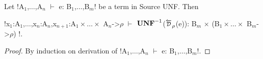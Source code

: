 \begin{lemma}
    Let !A$_{1}$,$\ldots$,A$_{n}$ $\vdash$ e: B$_{1}$,$\ldots$,B$_{m}$! be a term in Source UNF. Then
    \begin{center}
        !x$_1$:A$_{1}$,$\ldots$,x$_n$:A$_{n}$,x$_{n+1}$:A$_{1}\times\ldots\times$ A$_{n}$->$\rho$ $\vdash$ $\mathbf{UNF}^{-1}$($\Dsynrevsymbol_{\rho}$(e)): B$_m$ $\times$ (B$_{1}\times\ldots\times$ B$_{m}$->$\rho$) !.
    \end{center}
\end{lemma}
\begin{proof}
    By induction on derivation of !A$_{1}$,$\ldots$,A$_{n}$ $\vdash$ e: B$_{1}$,$\ldots$,B$_{m}$!.
\end{proof}



